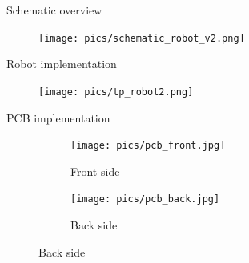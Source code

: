 \documentclass{beamer}
\begin{document}

\begin{frame}{Schematic overview}
	\begin{figure}
		\centering
		\texttt{[image: pics/schematic\_robot\_v2.png]}
	\end{figure}
\end{frame}

\begin{frame}{Robot implementation}
	\begin{figure}
		\centering
		\texttt{[image: pics/tp\_robot2.png]}
	\end{figure}
\end{frame}

\begin{frame}{PCB implementation}
	\vspace{1em}
	\begin{figure}
		\centering
		\begin{subfigure}[b]{0.35\textwidth}
			\texttt{[image: pics/pcb\_front.jpg]}
			\caption*{Front side}
		\end{subfigure}
		\qquad
		\begin{subfigure}[b]{0.35\textwidth}
			\texttt{[image: pics/pcb\_back.jpg]}
			\caption*{Back side}
		\end{subfigure}
	\end{figure}
\end{frame}
\end{document}
